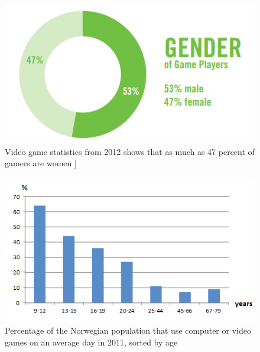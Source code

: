 \begin{figure}
\begin{center}
\includegraphics[scale=0.7]{gendergameplayers}
\caption[Gender of gameplayer]{Video game statistics from 2012 shows that as much as 47 percent of gamers are women \cite{statistics2012real}]}
\label{fig:GenderGamePlayers}
\end{center}
\end{figure}
\begin{figure}
\begin{center}
\includegraphics[scale=0.9]{gamestatisticsnorway}
\caption[Use of computer or video games, Norway, 2011]{Percentage of the Norwegian population that use computer or video games on an average day in 2011, sorted by age \cite{ssb2011}}
\label{fig:GameStatisticsNorway}
\end{center}
\end{figure}
       
